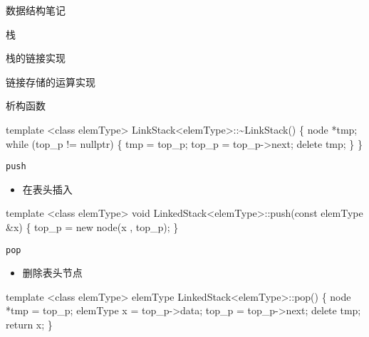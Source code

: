 \documentclass[
  ignorenonframetext,
]{beamer}
\newenvironment{Shaded}{}{}
\newcommand{\NormalTok}[1]{#1}
\providecommand{\tightlist}{%
  \setlength{\itemsep}{0pt}\setlength{\parskip}{0pt}}
\begin{document}
\begin{frame}[fragile]{数据结构笔记}
\begin{block}{栈}
\begin{block}{栈的链接实现}
\begin{block}{链接存储的运算实现}
\begin{block}{析构函数}
\protect{}\label{ux6790ux6784ux51fdux6570-2}
\begin{Shaded}
\begin{Highlighting}[]
\NormalTok{template \textless{}class elemType\textgreater{}}
\NormalTok{LinkStack\textless{}elemType\textgreater{}::\textasciitilde{}LinkStack()}
\NormalTok{\{}
\NormalTok{  node *tmp;}
\NormalTok{  while (top\_p != nullptr)}
\NormalTok{  \{}
\NormalTok{    tmp = top\_p;}
\NormalTok{    top\_p = top\_p{-}\textgreater{}next;}
\NormalTok{    delete tmp;}
\NormalTok{  \}}
\NormalTok{\}}
\end{Highlighting}
\end{Shaded}
\end{block}

\begin{block}{\texttt{push}}
\protect{}\label{push-1}
\begin{itemize}
\tightlist
\item
  在表头插入
\end{itemize}

\begin{Shaded}
\begin{Highlighting}[]
\NormalTok{template \textless{}class elemType\textgreater{}}
\NormalTok{void LinkedStack\textless{}elemType\textgreater{}::push(const elemType \&x)}
\NormalTok{\{}
\NormalTok{  top\_p = new node(x , top\_p);}
\NormalTok{\}}
\end{Highlighting}
\end{Shaded}
\end{block}

\begin{block}{\texttt{pop}}
\protect{}\label{pop-1}
\begin{itemize}
\tightlist
\item
  删除表头节点
\end{itemize}

\begin{Shaded}
\begin{Highlighting}[]
\NormalTok{template \textless{}class elemType\textgreater{}}
\NormalTok{elemType LinkedStack\textless{}elemType\textgreater{}::pop()}
\NormalTok{\{}
\NormalTok{  node *tmp = top\_p;}
\NormalTok{  elemType x = top\_p{-}\textgreater{}data;}
\NormalTok{  top\_p = top\_p{-}\textgreater{}next;}
\NormalTok{  delete tmp;}
\NormalTok{  return x;}
\NormalTok{\}}
\end{Highlighting}
\end{Shaded}
\end{block}


\end{block}
\end{block}
\end{block}
\end{frame}
\end{document}
